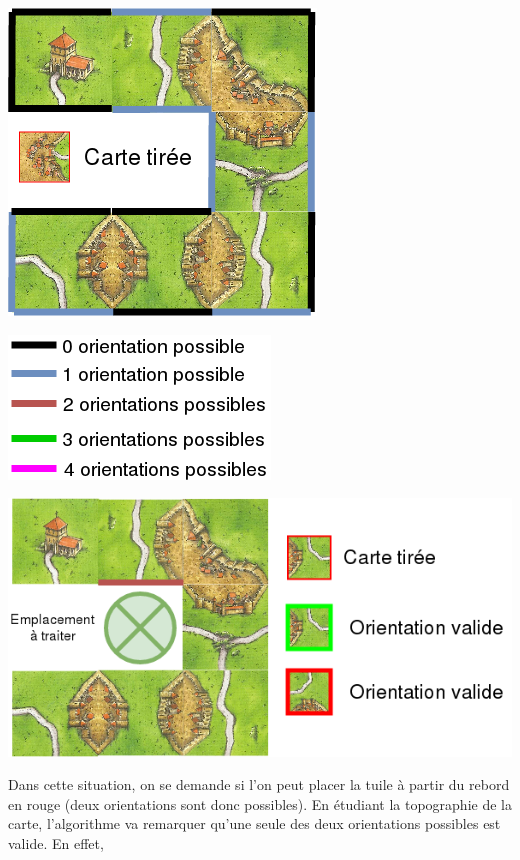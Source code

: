 \begin{minipage}{0.5\linewidth}
\includegraphics[scale=0.5]{CotePossible.png} 
\end{minipage}\hfill
\begin{minipage}{0.5\linewidth}
\includegraphics[scale=0.5]{CodeCouleur.png}
\end{minipage}

\vspace{1cm}

\begin{minipage}{0.7\linewidth}
\includegraphics[scale=0.5]{ChoixOrientation.png}
\end{minipage}\hfill
\begin{minipage}{0.3\linewidth}
Dans cette situation, on se demande si l'on peut placer la tuile à partir du rebord en rouge (deux orientations sont donc possibles). En étudiant la topographie de la carte, l'algorithme va remarquer qu'une seule des deux orientations possibles\hspace{0.2cm} est\hspace{0.2cm} valide.\hspace{0.2cm} En effet, 
\end{minipage}

